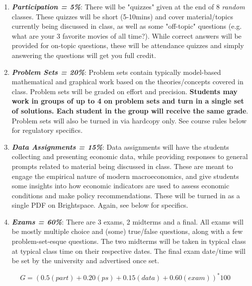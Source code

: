 \documentclass[11pt]{article}
\begin{document}
	\begin{enumerate}
		
		\item \textit{\textbf{Participation = 5\%}}: There will be "quizzes" given at the end of 8 \textit{random} classes. These quizzes will be short (5-10mins) and cover material/topics currently being discussed in class, as well as some "off-topic" questions (e.g. what are your 3 favorite movies of all time?). While correct answers will be provided for on-topic questions, these will be attendance quizzes and simply answering the questions will get you full credit. 
		
		\item \textbf{\textit{Problem Sets = 20\%}}: Problem sets contain typically model-based mathematical and graphical work based on the theories/concepts covered in class. Problem sets will be graded on effort and precision. \textbf{Students may work in groups of up to 4 on problem sets and turn in a single set of solutions. Each student in the group will receive the same grade}. Problem sets will also be turned in via hardcopy only. See course rules below for regulatory specifics. 
		
		\item \textbf{\textit{Data Assignments = 15\%}}: Data assignments will have the students collecting and presenting economic data, while providing responses to general prompts related to material being discussed in class. These are meant to engage the empirical nature of modern macroeconomics, and give students some insights into how economic indicators are used to assess economic conditions and make policy recommendations. These will be turned in as a single PDF on Brightspace. Again, see below for specifics. 
		
		\item \textbf{\textit{Exams = 60\%}}: There are 3 exams, 2 midterms and a final. All exams will be mostly multiple choice and (some) true/false questions, along with a few problem-set-esque questions. The two midterms will be taken in typical class at typical class time on their respective dates. The final exam date/time will be set by the university and advertised once set.   
		
	\end{enumerate}	
	

$$G = (0.5(part) + 0.20(ps) + 0.15(data) + 0.60(exam))^{*}100$$
\end{document}
